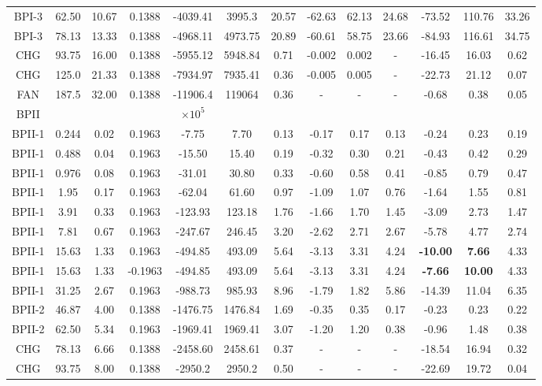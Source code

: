 \documentclass[8.5pt,twoside,twocolumn]{article}
\begin{document}
\begin{table}[htpb]
\begin{tabular}{|c||c|| c || c || c |c |c||c| c| c||c| c| c|}
\hline
BPI-3 & 62.50 & 10.67& 0.1388 & -4039.41 &3995.3  & 20.57 & -62.63 & 62.13 & 24.68 &-73.52 & 110.76 & 33.26 \\
BPI-3 &78.13 &13.33 & 0.1388 & -4968.11 &4973.75 &20.89 &-60.61 &58.75 &23.66 &-84.93 &116.61 &34.75 \\
\hline
CHG & 93.75 &16.00 & 0.1388 & -5955.12 &5948.84 & 0.71 & -0.002 & 0.002 & -  & -16.45 & 16.03 &0.62 \\
CHG & 125.0 & 21.33& 0.1388 & -7934.97 & 7935.41 & 0.36 & -0.005 & 0.005 & - &-22.73 & 21.12 & 0.07\\
\hline
FAN & 187.5 & 32.00& 0.1388 &-11906.4  &119064 &0.36 &- &- &- &-0.68 & 0.38 & 0.05\\
\hline

BPII  & & & & $\times 10^5$ \\
\hline
BPII-1 & 0.244 &0.02 & 0.1963 &-7.75 &7.70 &0.13 &-0.17 &0.17 &0.13 &-0.24 &0.23 &0.19 \\
BPII-1 & 0.488 &0.04 & 0.1963 &-15.50 &15.40 &0.19 &-0.32 &0.30 &0.21 &-0.43 &0.42 &0.29 \\
BPII-1 & 0.976 &0.08 & 0.1963 &-31.01 &30.80 &0.33 &-0.60 &0.58 &0.41 &-0.85 &0.79 &0.47 \\
BPII-1 & 1.95 &0.17  & 0.1963 &-62.04  &61.60 & 0.97 & -1.09 &1.07 & 0.76 & -1.64 & 1.55 & 0.81\\
BPII-1 &3.91 & 0.33& 0.1963 &-123.93 &123.18 & 1.76 &-1.66 &1.70 & 1.45 &-3.09& 2.73 &1.47\\
BPII-1 &7.81 &0.67 & 0.1963  &-247.67 &246.45 & 3.20 &-2.62 &2.71 & 2.67 &-5.78 & 4.77 &2.74\\
BPII-1 &15.63 & 1.33& 0.1963 &-494.85 &493.09 & 5.64 &-3.13 &3.31 &4.24 &\bf{-10.00} & \bf{7.66} &4.33\\
BPII-1 & 15.63 & 1.33& -0.1963&-494.85 &493.09 & 5.64 & -3.13 &3.31 &4.24 &\bf{-7.66} & \bf{10.00} &4.33\\
BPII-1 & 31.25 &2.67 & 0.1963 &-988.73 &985.93 &8.96  &-1.79 &1.82 &5.86 &-14.39 & 11.04 &6.35\\
\hline
BPII-2 & 46.87 &4.00 & 0.1388 & -1476.75 & 1476.84 &1.69 &-0.35  &0.35  & 0.17 &-0.23 &0.23  & 0.22\\
BPII-2 & 62.50 & 5.34& 0.1963 & -1969.41  & 1969.41 & 3.07 & -1.20 & 1.20 & 0.38 &-0.96 & 1.48 &0.38 \\
\hline
CHG & 78.13 & 6.66 &  0.1388 &-2458.60 & 2458.61  &0.37 &- &- &- &-18.54 &16.94 &0.32 \\
CHG & 93.75 &8.00 & 0.1388 &-2950.2  &2950.2 &0.50 &- &- &- &-22.69 & 19.72 & 0.04\\

\end{tabular}
\end{table}
\end{document}
